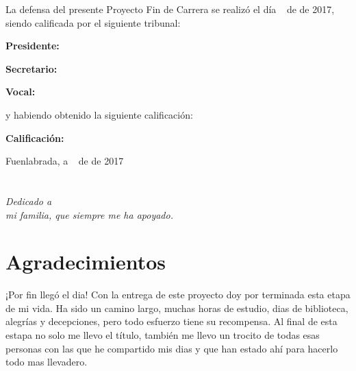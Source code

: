 \documentclass[a4paper, 12pt]{book}
\begin{document}
\vspace{1cm}
La defensa del presente Proyecto Fin de Carrera se realizó el día \qquad$\;\,$ de \qquad\qquad\qquad\qquad \newline de 2017, siendo calificada por el siguiente tribunal:


\vspace{0.5cm}
\textbf{Presidente:}

\vspace{1.2cm}
\textbf{Secretario:}

\vspace{1.2cm}
\textbf{Vocal:}


\vspace{1.2cm}
y habiendo obtenido la siguiente calificación:

\vspace{1cm}
\textbf{Calificación:}


\vspace{1cm}
\begin{flushright}
Fuenlabrada, a \qquad$\;\,$ de \qquad\qquad\qquad\qquad de 2017
\end{flushright}


\chapter*{}
\begin{flushright}
\textit{Dedicado a \\
mi familia, que siempre me ha apoyado.}
\end{flushright}


\chapter*{Agradecimientos}

¡Por fin llegó el dia! Con la entrega de este proyecto doy por terminada esta etapa de mi vida. Ha sido un camino largo, muchas horas de estudio, dias de biblioteca, alegrías y decepciones, pero todo esfuerzo tiene su recompensa. Al final de esta estapa no solo me llevo el título, también me llevo un trocito de todas esas personas con las que he compartido mis dias y que han estado ahí para hacerlo todo mas llevadero.
\end{document}
